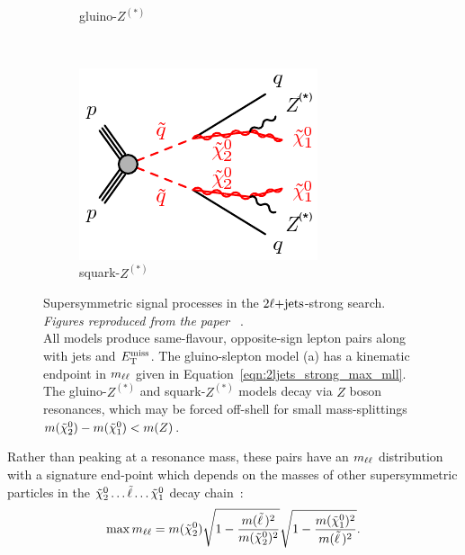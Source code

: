 \begin{figure}[tp]
\begin{subfigure}{0.47\textwidth}
  \caption{gluino-$Z^{(*)}$}
\end{subfigure}
\\[0.5em]
\begin{subfigure}{0.45\textwidth}
  \centering
  \includegraphics[width=\textwidth]{figures/2ljets_strong_sqsq_qqZZN1N1.pdf}
  \caption{squark-$Z^{(*)}$}
\end{subfigure}
\caption{%
Supersymmetric signal processes in the $2\ell\mathrm{+jets}$-strong search.
\emph{Figures reproduced from the paper%
}~\cite{atlas2022searches, atlas_susy_feynman}.
\\[0.5em]
All models produce same-flavour, opposite-sign lepton pairs along with jets
and $E_\mathrm{T}^\mathrm{miss}$.
The gluino-slepton model (a) has a kinematic endpoint in $m_{\ell\ell}$
given in Equation~\ref{eqn:2ljets_strong_max_mll}.
The gluino-$Z^{(*)}$ and squark-$Z^{(*)}$ models decay via $Z$ boson
resonances, which may be forced off-shell for small mass-splittings
$m(\tilde\chi^0_2) - m(\tilde\chi^0_1) < m(Z)$.
}
\label{fig:2ljets_strong_signal_diagrams}
\end{figure}

Rather than peaking at a resonance mass, these pairs have an $m_{\ell\ell}$
distribution with a signature end-point which depends on the masses of other
supersymmetric particles in the
$\tilde\chi^0_2 \ldots \tilde\ell \ldots \tilde\chi^0_1$
decay chain~\cite{paige1996determining}:
\begin{equation}
\label{eqn:2ljets_strong_max_mll}
\max m_{\ell\ell}
= m(\tilde\chi^0_2)
\sqrt{1 - \frac{m(\tilde\ell\,)^2}{m(\tilde\chi^0_2)^2}}
\sqrt{1 - \frac{m(\tilde\chi^0_1)^2}{m(\tilde\ell\,)^2}}
.
\end{equation}

